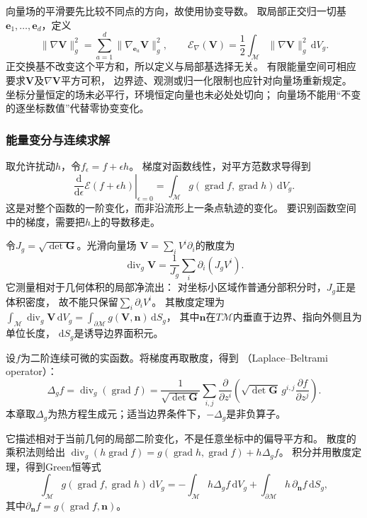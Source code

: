 向量场的平滑要先比较不同点的方向，故使用协变导数。
取局部正交归一切基$\bm e_1,\ldots,\bm e_d$，定义
\[
 \lVert\nabla\bm V\rVert_g^2
 =\sum_{a=1}^d\lVert\nabla_{\bm e_a}\bm V\rVert_g^2,\qquad
 \mathcal E_\nabla(\bm V)
 =\frac12\int_{\mathcal M}\lVert\nabla\bm V\rVert_g^2\,\mathrm dV_g.
\]
正交换基不改变这个平方和，所以定义与局部基选择无关。
有限能量空间可相应要求$\bm V$及$\nabla\bm V$平方可积，
边界迹、观测或归一化限制也应针对向量场重新规定。
坐标分量恒定的场未必平行，环境恒定向量也未必处处切向；
向量场不能用“不变的逐坐标数值”代替零协变变化。

\subsubsection{能量变分与连续求解}
\label{sec:geometry-energy-variation-solvers}

取允许扰动$h$，令$f_\epsilon=f+\epsilon h$。
梯度对函数线性，对平方范数求导得到
\begin{equation}
 \left.\frac{\mathrm d}{\mathrm d\epsilon}
  \mathcal E(f+\epsilon h)\right|_{\epsilon=0}
 =\int_{\mathcal M}
    g(\operatorname{grad}f,\operatorname{grad}h)\,\mathrm dV_g.
 \label{eq:geometry-dirichlet-first-variation}
\end{equation}
这是对整个函数的一阶变化，而非沿流形上一条点轨迹的变化。
要识别函数空间中的梯度，需要把$h$上的导数移走。

令$J_g=\sqrt{\det\bm G}$。光滑向量场
$\bm V=\sum_iV^i\partial_i$的散度为
\[
 \operatorname{div}_g\bm V
 =\frac1{J_g}\sum_i\partial_i(J_gV^i).
\]
它测量相对于几何体积的局部净流出：
对坐标小区域作普通分部积分时，$J_g$正是体积密度，
故不能只保留$\sum_i\partial_iV^i$。
其散度定理为
$\int_{\mathcal M}\operatorname{div}_g\bm V\,\mathrm dV_g
=\int_{\partial\mathcal M}g(\bm V,\bm n)\,\mathrm dS_g$，
其中$\bm n$在$T\mathcal M$内垂直于边界、指向外侧且为单位长度，
$\mathrm dS_g$是诱导边界面积元。

\begin{definition}
\label{def:geometry-laplace-beltrami}
设$f$为二阶连续可微的实函数。将梯度再取散度，得到
（Laplace--Beltrami operator）：
\begin{equation}
 \Delta_g f=\operatorname{div}_g(\operatorname{grad}f)
 =\frac1{\sqrt{\det\bm G}}\sum_{i,j}
  \frac{\partial}{\partial z^i}
   \left(\sqrt{\det\bm G}\,g^{i,j}
                   \frac{\partial f}{\partial z^j}\right).
 \label{eq:geometry-laplace-beltrami}
\end{equation}
本章取$\Delta_g$为热方程生成元；适当边界条件下，$-\Delta_g$是非负算子。
\end{definition}
它描述相对于当前几何的局部二阶变化，不是任意坐标中的偏导平方和。
散度的乘积法则给出
$\operatorname{div}_g(h\operatorname{grad}f)
=g(\operatorname{grad}h,\operatorname{grad}f)+h\Delta_gf$。
积分并用散度定理，得到Green恒等式
\begin{equation}
 \int_{\mathcal M}g(\operatorname{grad}f,\operatorname{grad}h)\,\mathrm dV_g
 =-\int_{\mathcal M}h\Delta_gf\,\mathrm dV_g
   +\int_{\partial\mathcal M}h\,\partial_{\bm n}f\,\mathrm dS_g,
 \label{eq:geometry-green-identity}
\end{equation}
其中$\partial_{\bm n}f=g(\operatorname{grad}f,\bm n)$。

